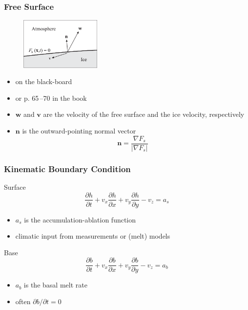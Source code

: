 \documentclass[hide notes,intlimits]{beamer}
\begin{document}
\begin{frame}
  \frametitle{Free Surface}
  \begin{figure}
    \includegraphics[width=4cm]{figures/fig_5_03}%
  \end{figure}
  \begin{itemize}
  \item on the black-board
  \item or p. 65\,--70 in the book
  \item $\mathbf{w}$ and $\mathbf{v}$ are the velocity of the free surface and the ice velocity, respectively
  \item $\mathbf{n}$ is the outward-pointing normal vector
    \begin{equation*}
      \mathbf{n} = \frac{\nabla F_{s}}{\vert \nabla F_{s} \vert}
    \end{equation*}
  \end{itemize}
\end{frame}

\begin{frame}
  \frametitle{Kinematic Boundary Condition}
  \begin{block}{Surface}
    \begin{equation}
      \frac{\partial h}{\partial t} + v_{x}\frac{\partial h}{\partial x} + v_{y}\frac{\partial h}{\partial y} - v_{z} = a_{s}
    \end{equation}
    \begin{itemize}
    \item $a_{s}$ is the \alert{accumulation-ablation} function
      \item climatic input from measurements or (melt) models
    \end{itemize}
  \end{block}
  \begin{block}{Base}
    \begin{equation}
     \frac{\partial b}{\partial t} + v_{x}\frac{\partial b}{\partial x} + v_{y}\frac{\partial b}{\partial y} - v_{z} = a_{b}
    \end{equation}
    \begin{itemize}
    \item $a_{b}$ is the \alert{basal melt rate}
      \item often $\partial b/\partial t = 0$
    \end{itemize}
  \end{block}
\end{frame}
\end{document}

